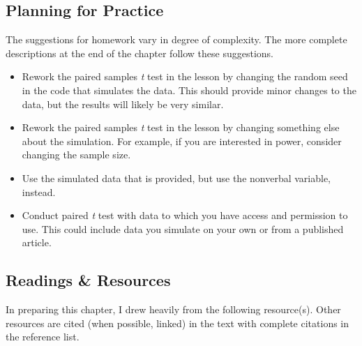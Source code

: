 \documentclass[
  11pt,
]{book}
\providecommand{\tightlist}{%
  \setlength{\itemsep}{0pt}\setlength{\parskip}{0pt}}
\begin{document}
\hypertarget{planning-for-practice-3}{%
\subsection{Planning for Practice}\label{planning-for-practice-3}}

The suggestions for homework vary in degree of complexity. The more complete descriptions at the end of the chapter follow these suggestions.

\begin{itemize}
\tightlist
\item
  Rework the paired samples \emph{t} test in the lesson by changing the random seed in the code that simulates the data. This should provide minor changes to the data, but the results will likely be very similar.
\item
  Rework the paired samples \emph{t} test in the lesson by changing something else about the simulation. For example, if you are interested in power, consider changing the sample size.
\item
  Use the simulated data that is provided, but use the nonverbal variable, instead.
\item
  Conduct paired \emph{t} test with data to which you have access and permission to use. This could include data you simulate on your own or from a published article.
\end{itemize}

\hypertarget{readings-resources-3}{%
\subsection{Readings \& Resources}\label{readings-resources-3}}

In preparing this chapter, I drew heavily from the following resource(s). Other resources are cited (when possible, linked) in the text with complete citations in the reference list.
\end{document}
